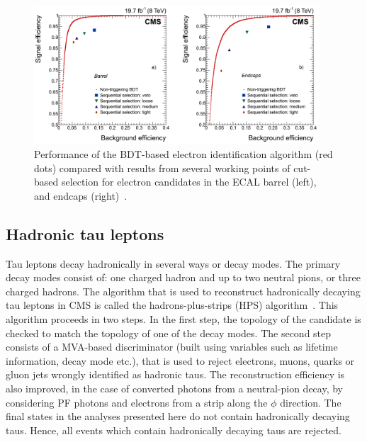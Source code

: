 \begin{figure}[!htpb]\centering
 \includegraphics[width=0.95\textwidth]{plots_and_figures/chapter4/elec_eff.png}
\caption{Performance of the BDT-based electron identification algorithm (red dots) compared with results from several working points of cut-based selection for electron candidates in the ECAL barrel (left), and endcaps (right)~\cite{e_recon}.}
 \label{fig:elec_eff}
\end{figure}


\subsection{Hadronic tau leptons}
\label{tau_recon}
Tau leptons decay hadronically in several ways or decay modes. The primary decay modes consist of: one charged hadron and up to two neutral pions, or three charged hadrons. The algorithm that is used to reconstruct hadronically decaying tau leptons in CMS is called the hadrons-plus-strips (HPS) algorithm~\cite{Khachatryan:2015dfa,Sirunyan:tau16}. This algorithm proceeds in two steps. In the first step, the topology of the candidate is checked to match the topology of one of the decay modes. The second step consists of a MVA-based discriminator (built using variables such as lifetime information, decay mode etc.), that is used to reject electrons, muons, quarks or gluon jets wrongly identified as hadronic taus. The reconstruction efficiency is also improved, in the case of converted photons from a neutral-pion decay, by considering PF photons and electrons from a strip along the $\phi$ direction. The final states in the analyses presented here do not contain hadronically decaying taus. Hence, all events which contain hadronically decaying taus are rejected.


